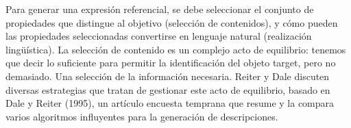 Para generar una expresi\'on referencial, se debe seleccionar el
conjunto de propiedades que distingue al objetivo (selecci\'on de contenidos), y c\'omo pueden las propiedades seleccionadas
convertirse en lenguaje natural (realizaci\'on ling\"u\'istica). La selecci\'on de contenido es un
complejo acto de equilibrio: tenemos que decir lo suficiente para permitir la identificaci\'on del objeto target, pero no demasiado. Una selecci\'on de la informaci\'on necesaria. Reiter y Dale discuten diversas estrategias que tratan de gestionar este
acto de equilibrio, basado en Dale y Reiter (1995), un art\'iculo encuesta temprana que resume
y la compara varios algoritmos influyentes para la generaci\'on de descripciones.



